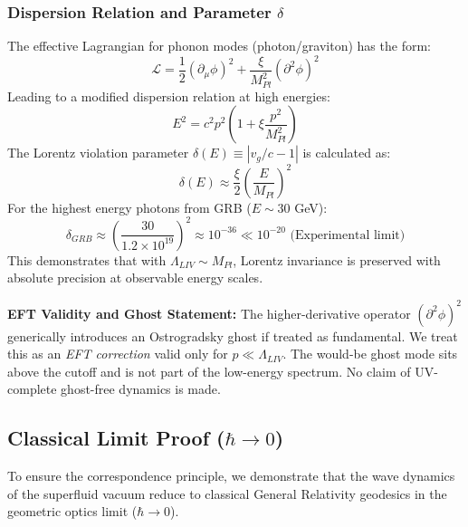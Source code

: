 \documentclass[a4paper,12pt]{article}
\begin{document}
\subsubsection{Dispersion Relation and Parameter $\delta$}
The effective Lagrangian for phonon modes (photon/graviton) has the form:
\begin{equation}
 \mathcal{L} = \frac{1}{2} (\partial_\mu \phi)^2 + \frac{\xi}{M_{Pl}^2} (\partial^2 \phi)^2
\end{equation}
Leading to a modified dispersion relation at high energies:
\begin{equation}
 E^2 = c^2 p^2 \left( 1 + \xi \frac{p^2}{M_{Pl}^2} \right)
\end{equation}
The Lorentz violation parameter $\delta(E) \equiv |v_g/c - 1|$ is calculated as:
\begin{equation}
 \delta(E) \approx \frac{\xi}{2} \left( \frac{E}{M_{Pl}} \right)^2
\end{equation}
For the highest energy photons from GRB ($E \sim 30$ GeV):
\begin{equation}
 \delta_{GRB} \approx \left( \frac{30}{1.2 \times 10^{19}} \right)^2 \approx 10^{-36} \ll 10^{-20} \text{ (Experimental limit)}
\end{equation}
This demonstrates that with $\Lambda_{LIV} \sim M_{Pl}$, Lorentz invariance is preserved with absolute precision at observable energy scales.

\textbf{EFT Validity and Ghost Statement:}
The higher-derivative operator $(\partial^2\phi)^2$ generically introduces an Ostrogradsky ghost if treated as fundamental. We treat this as an \emph{EFT correction} valid only for $p \ll \Lambda_{LIV}$. The would-be ghost mode sits above the cutoff and is not part of the low-energy spectrum. No claim of UV-complete ghost-free dynamics is made.


\subsection{Classical Limit Proof ($\hbar \to 0$)}

To ensure the correspondence principle, we demonstrate that the wave dynamics of the superfluid vacuum reduce to classical General Relativity geodesics in the geometric optics limit ($\hbar \to 0$).
\end{document}
